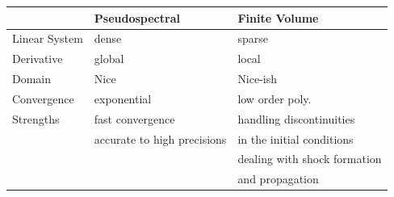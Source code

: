 \begin{center}
  \begin{tabular}{ l |l l }
      & Pseudospectral & Finite Volume \\ \hline
    Linear System & dense & sparse \\ 
   Derivative & global & local\\
Domain  & Nice & Nice-ish\\
Convergence  & exponential & low order poly.\\
Strengths  & fast convergence & handling discontinuities \\
& accurate to high precisions & in the initial conditions \\
& & dealing with shock formation \\
& & and propagation \\
    \hline
  \end{tabular}
\end{center}

